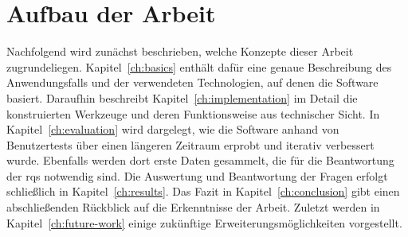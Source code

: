 \section{Aufbau der Arbeit}\label{sec:structure}

Nachfolgend wird zunächst beschrieben, welche Konzepte dieser Arbeit zugrundeliegen.
Kapitel~\ref{ch:basics} enthält dafür eine genaue Beschreibung des Anwendungsfalls und der verwendeten Technologien, auf denen die Software basiert.
Daraufhin beschreibt Kapitel~\ref{ch:implementation} im Detail die konstruierten Werkzeuge und deren Funktionsweise aus technischer Sicht.
In Kapitel~\ref{ch:evaluation} wird dargelegt, wie die Software anhand von Benutzertests über einen längeren Zeitraum erprobt und iterativ verbessert wurde.
Ebenfalls werden dort erste Daten gesammelt, die für die Beantwortung der \acp{rq} notwendig sind.
Die Auswertung und Beantwortung der Fragen erfolgt schließlich in Kapitel~\ref{ch:results}.
Das Fazit in Kapitel~\ref{ch:conclusion} gibt einen abschließenden Rückblick auf die Erkenntnisse der Arbeit.
Zuletzt werden in Kapitel~\ref{ch:future-work} einige zukünftige Erweiterungsmöglichkeiten vorgestellt.
